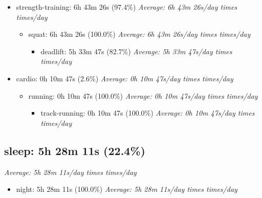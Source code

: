 \documentclass[12pt]{extarticle}
\begin{document}
\begin{itemize}[topsep=0pt, itemsep=-0.5ex]
    \item strength-training: 6h 43m 26s (97.4\%)
        \textit{Average: 6h 43m 26s/day  times  times/day}\par
\begin{itemize}[topsep=0pt, itemsep=-0.5ex]
    \item squat: 6h 43m 26s (100.0\%)
        \textit{Average: 6h 43m 26s/day  times  times/day}\par
\begin{itemize}[topsep=0pt, itemsep=-0.5ex]
    \item deadlift: 5h 33m 47s (82.7\%)
        \textit{Average: 5h 33m 47s/day  times  times/day}\par
\end{itemize}
\end{itemize}
    \item cardio: 0h 10m 47s (2.6\%)
        \textit{Average: 0h 10m 47s/day  times  times/day}\par
\begin{itemize}[topsep=0pt, itemsep=-0.5ex]
    \item running: 0h 10m 47s (100.0\%)
        \textit{Average: 0h 10m 47s/day  times  times/day}\par
\begin{itemize}[topsep=0pt, itemsep=-0.5ex]
    \item track-running: 0h 10m 47s (100.0\%)
        \textit{Average: 0h 10m 47s/day  times  times/day}\par
\end{itemize}
\end{itemize}
\end{itemize}
{\fontsize{16}{19.2}\selectfont\subsection*{sleep: 5h 28m 11s (22.4\%)}}
\textit{Average: 5h 28m 11s/day  times  times/day}\par
\begin{itemize}[topsep=0pt, itemsep=-0.5ex]
    \item night: 5h 28m 11s (100.0\%)
        \textit{Average: 5h 28m 11s/day  times  times/day}\par
\end{itemize}
\end{document}
